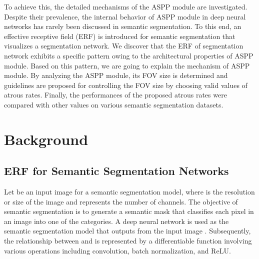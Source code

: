 \documentclass{article}
\begin{document}
To achieve this, the detailed mechanisms of the ASPP module are investigated. Despite their prevalence, the internal behavior of ASPP module in deep neural networks has rarely been discussed in semantic segmentation. To this end, an effective receptive field (ERF) is introduced for semantic segmentation that visualizes a segmentation network. We discover that the ERF of segmentation network exhibits a specific pattern owing to the architectural properties of ASPP module. Based on this pattern, we are going to explain the mechanism of ASPP module. By analyzing the ASPP module, its FOV size is determined and guidelines are proposed for controlling the FOV size by choosing valid values of atrous rates. Finally, the performances of the proposed atrous rates were compared with other values on various semantic segmentation datasets.



\section{Background}
\label{sec:back}

\subsection{ERF for Semantic Segmentation Networks}
Let  be an input image for a semantic segmentation model, where  is the resolution or size of the image and  represents the number of channels. The objective of semantic segmentation is to generate a semantic mask  that classifies each pixel in an image  into one of the  categories. A deep neural network is used as the semantic segmentation model that outputs  from the input image . Subsequently, the relationship between  and  is represented by a differentiable function involving various operations including convolution, batch normalization, and ReLU.
\end{document}
